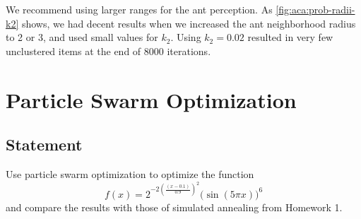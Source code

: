\documentclass[12pt]{article}
\begin{document}
We recommend using larger ranges for the ant perception.
As \autoref{fig:aca:prob-radii-k2} shows, we had decent results when we increased the ant neighborhood radius to 2 or 3, and used small values for $k_2$.
Using $k_2 = 0.02$ resulted in very few unclustered items at the end of 8000 iterations.

\clearpage
\section{Particle Swarm Optimization}

\subsection{Statement}

Use particle swarm optimization to optimize the function
\begin{equation}
    f(x) = 2^{-2{\left(\frac{(x - 0.1)}{0.9}\right)}^2}{\big(\sin(5\pi x)\big)}^6\label{eq:pso:objective}
\end{equation}
and compare the results with those of simulated annealing from Homework 1.
\end{document}
